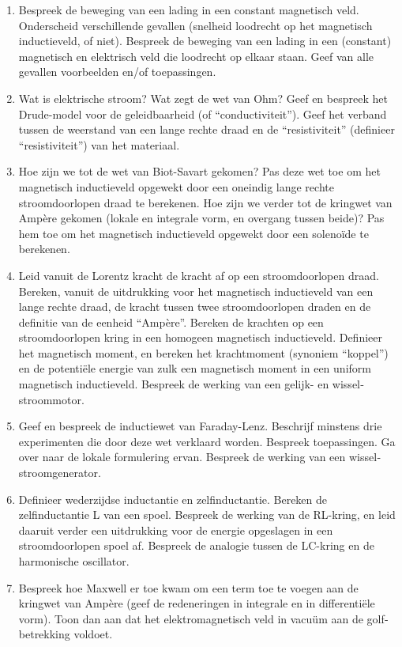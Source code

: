 \documentclass[12pt]{article}
\begin{document}
\begin{enumerate}
        \item Bespreek de beweging van een lading in een constant magnetisch veld. Onderscheid verschillende gevallen (snelheid loodrecht op het magnetisch inductieveld, of niet). Bespreek de beweging van een lading in een (constant) magnetisch en elektrisch veld die loodrecht op elkaar staan. Geef van alle gevallen voorbeelden en/of toepassingen.
        \item Wat is elektrische stroom? Wat zegt de wet van Ohm? Geef en bespreek het Drude-model voor de geleidbaarheid (of “conductiviteit”). Geef het verband tussen de weerstand van een lange rechte draad en de “resistiviteit” (definieer “resistiviteit”) van het materiaal.
        \item Hoe zijn we tot de wet van Biot-Savart gekomen? Pas deze wet toe om het magnetisch inductieveld opgewekt door een oneindig lange rechte stroomdoorlopen draad te berekenen. Hoe zijn we verder tot de kringwet van Ampère gekomen (lokale en integrale vorm, en overgang tussen beide)? Pas hem toe om het magnetisch inductieveld opgewekt door een solenoïde te berekenen.
        \item Leid vanuit de Lorentz kracht de kracht af op een stroomdoorlopen draad. Bereken, vanuit de uitdrukking voor het magnetisch inductieveld van een lange rechte draad, de kracht tussen twee stroomdoorlopen draden en de definitie van de eenheid “Ampère”. Bereken de krachten op een stroomdoorlopen kring in een homogeen magnetisch inductieveld. Definieer het magnetisch moment, en bereken het krachtmoment (synoniem “koppel”) en de potentiële energie van zulk een magnetisch moment in een uniform magnetisch inductieveld. Bespreek de werking van een gelijk- en wissel­stroommotor.
        \item Geef en bespreek de inductiewet van Faraday-Lenz. Beschrijf minstens drie experimenten die door deze wet verklaard worden. Bespreek toepassingen. Ga over naar de lokale formulering ervan. Bespreek de werking van een wissel­stroom­generator.
        \item Definieer wederzijdse inductantie en zelfinductantie. Bereken de zelfinductantie L van een spoel. Bespreek de werking van de RL-kring, en leid daaruit verder een uitdrukking voor de energie opgeslagen in een stroomdoorlopen spoel af. Bespreek de analogie tussen de LC-kring en de harmonische oscillator.
        \item Bespreek hoe Maxwell er toe kwam om een term toe te voegen aan de kringwet van Ampère (geef de redeneringen in integrale en in differentiële vorm). Toon dan aan dat het elektromagnetisch veld in vacuüm aan de golf­betrekking voldoet. 

\end{enumerate}
\end{document}
